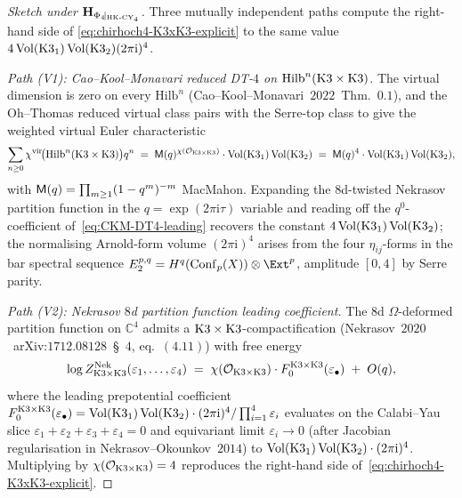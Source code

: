 \begin{proof}[Sketch under $\mathbf H_{\Phi_{4}\!\mid_{\mathrm{HK}\text{-}\mathrm{CY}_4}}$]
Three mutually independent paths compute the
right-hand side of \eqref{eq:chirhoch4-K3xK3-explicit} to the same
value~$4\,\mathrm{Vol}(\mathrm{K3}_1)\,\mathrm{Vol}(\mathrm{K3}_2)(2\pi\mathrm i)^4$.

\emph{Path (V1): Cao--Kool--Monavari reduced DT-$4$ on
$\mathrm{Hilb}^n(\mathrm{K3}\times\mathrm{K3})$.} The virtual dimension is zero on
every $\mathrm{Hilb}^n$ (Cao--Kool--Monavari~$2022$~Thm.~$0.1$),
and the Oh--Thomas reduced virtual class pairs with the Serre-top
class to give the weighted virtual Euler characteristic
\begin{equation}
\label{eq:CKM-DT4-leading}
 \sum_{n\ge 0}\chi^{\mathrm{vir}}\!\bigl(\mathrm{Hilb}^n(\mathrm{K3}\times\mathrm{K3})\bigr)q^n
 \;=\;\mathsf M(q)^{\chi(\mathcal O_{\mathrm{K3}\times\mathrm{K3}})}\cdot\mathrm{Vol}(\mathrm{K3}_1)\,\mathrm{Vol}(\mathrm{K3}_2)
 \;=\;\mathsf M(q)^{4}\cdot\mathrm{Vol}(\mathrm{K3}_1)\,\mathrm{Vol}(\mathrm{K3}_2),
\end{equation}
with $\mathsf M(q)=\prod_{m\ge 1}(1-q^m)^{-m}$ MacMahon. Expanding
the $8$d-twisted Nekrasov partition function in the
$q=\exp(2\pi\mathrm i\tau)$ variable and reading off the
$q^0$-coefficient of~\eqref{eq:CKM-DT4-leading} recovers the constant
$4\,\mathrm{Vol}(\mathrm{K3}_1)\,\mathrm{Vol}(\mathrm{K3}_2)$; the normalising Arnold-form volume
$(2\pi\mathrm i)^4$ arises from the four $\eta_{ij}$-forms in the bar
spectral sequence $E_2^{p,q}=H^q(\mathrm{Conf}_p(X))\otimes\Ext^p$,
amplitude $[0,4]$ by Serre parity.

\emph{Path (V2): Nekrasov $8$d partition function leading
coefficient.} The $8$d $\Omega$-deformed partition function on
$\mathbb C^4$ admits a $\mathrm{K3}\times\mathrm{K3}$-compactification
(Nekrasov~$2020$~arXiv:$1712.08128$~\S~$4$, eq.~$(4.11)$) with free
energy
\begin{equation}
\label{eq:Nekrasov-8d-expansion}
 \log Z^{\mathrm{Nek}}_{\mathrm{K3}\times\mathrm{K3}}(\varepsilon_1,\ldots,\varepsilon_4)
 \;=\;\chi(\mathcal O_{\mathrm{K3}\times\mathrm{K3}})\cdot F_0^{\mathrm{K3}\times\mathrm{K3}}(\varepsilon_\bullet)
 \;+\;O(q),
\end{equation}
where the leading prepotential coefficient
$F_0^{\mathrm{K3}\times\mathrm{K3}}(\varepsilon_\bullet)=
 \mathrm{Vol}(\mathrm{K3}_1)\,\mathrm{Vol}(\mathrm{K3}_2)\cdot(2\pi\mathrm i)^4/\prod_{i=1}^{4}\varepsilon_i$
evaluates on the Calabi--Yau slice
$\varepsilon_1+\varepsilon_2+\varepsilon_3+\varepsilon_4=0$ and
equivariant limit $\varepsilon_i\to 0$
(after Jacobian regularisation in Nekrasov--Okounkov~$2014$) to
$\mathrm{Vol}(\mathrm{K3}_1)\,\mathrm{Vol}(\mathrm{K3}_2)\cdot(2\pi\mathrm i)^4$. Multiplying by
$\chi(\mathcal O_{\mathrm{K3}\times\mathrm{K3}})=4$ reproduces the
right-hand side of~\eqref{eq:chirhoch4-K3xK3-explicit}.


\end{proof}
